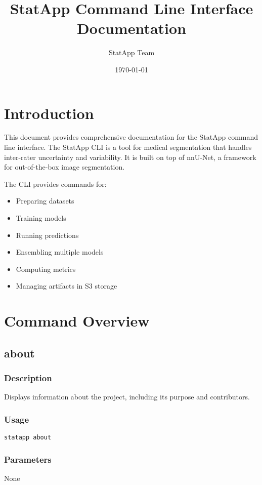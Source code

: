 \documentclass{article}
\title{StatApp Command Line Interface Documentation}
\author{StatApp Team}
\date{\today}
\begin{document}
\maketitle
\tableofcontents
\newpage

\section{Introduction}
This document provides comprehensive documentation for the StatApp command line interface. The StatApp CLI is a tool for medical segmentation that handles inter-rater uncertainty and variability. It is built on top of nnU-Net, a framework for out-of-the-box image segmentation.

The CLI provides commands for:
\begin{itemize}
    \item Preparing datasets
    \item Training models
    \item Running predictions
    \item Ensembling multiple models
    \item Computing metrics
    \item Managing artifacts in S3 storage
\end{itemize}

\section{Command Overview}

\subsection{about}
\subsubsection{Description}
Displays information about the project, including its purpose and contributors.

\subsubsection{Usage}
\begin{lstlisting}
statapp about
\end{lstlisting}

\subsubsection{Parameters}
None
\end{document}

